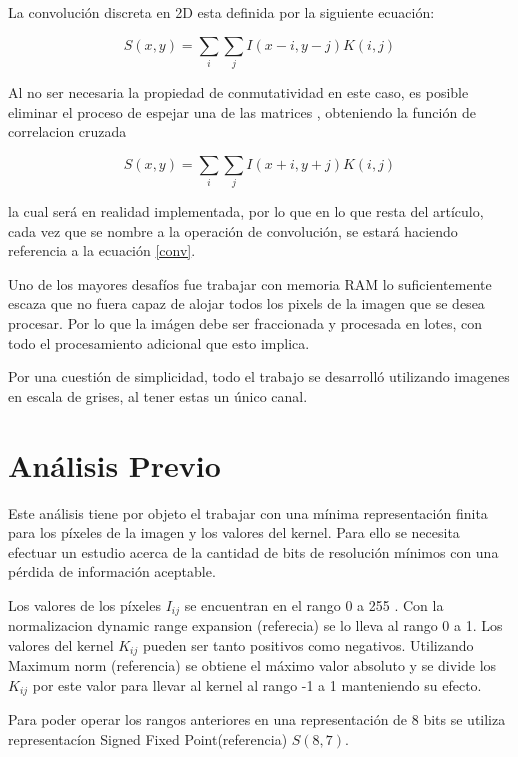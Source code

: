 \documentclass[conference,compsoc]{IEEEtran}
\begin{document}
La convoluci\'on discreta en 2D esta definida por la siguiente
ecuaci\'on: 

\begin{equation}\label{conv-org}
S(x,y) = \sum_{i} \sum_{j}I(x-i,y-j)K(i, j)
\end{equation}

Al no ser necesaria la propiedad de conmutatividad en este caso, es posible
eliminar el proceso de espejar una de las matrices\cite{Goodfellow-et-al-2016} ,
obteniendo la funci\'on de correlacion cruzada

\begin{equation}\label{conv}
S(x,y) = \sum_{i} \sum_{j}I(x+i,y+j)K(i, j)
\end{equation}

la cual ser\'a en realidad  implementada, por lo que en lo que resta
del art\'iculo, cada vez que se nombre a la operaci\'on de convoluci\'on,
se estar\'a haciendo referencia a la ecuaci\'on \ref{conv}.

Uno de los mayores desaf\'ios fue trabajar con memoria RAM lo suficientemente
escaza que no fuera capaz de alojar todos los pixels de la imagen que se desea
procesar. Por lo que la im\'agen debe ser fraccionada y procesada en lotes, con
todo el procesamiento adicional que esto implica.

Por una cuesti\'on de simplicidad, todo el trabajo se desarroll\'o utilizando
imagenes en escala de grises, al tener estas un \'unico canal.


\section{An\'alisis Previo}
Este an\'alisis tiene por objeto el trabajar con una m\'inima representaci\'on finita para los p\'ixeles de la imagen y los valores del kernel. Para ello se necesita efectuar un estudio acerca de la cantidad de bits de resoluci\'on m\'inimos  con una p\'erdida
de informaci\'on aceptable.

Los valores de los p\'ixeles \(I_{ij}\) se encuentran en el rango 0 a 255 . Con la normalizacion dynamic range expansion (referecia) se lo lleva al rango 0 a 1. Los valores del kernel \(K_{ij}\) pueden ser tanto positivos como negativos. Utilizando Maximum norm (referencia) se obtiene el m\'aximo valor absoluto y se divide los \(K_{ij}\) por este valor para llevar al kernel al rango -1 a 1 manteniendo su efecto. 

Para poder operar los rangos anteriores en una representaci\'on de 8 bits se utiliza representac\'ion Signed Fixed Point(referencia) \(S(8,7)\). 
\end{document}
